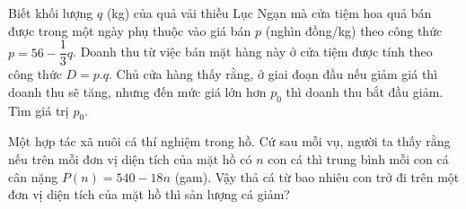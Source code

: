 \begin{bt}%
	Biết khối lượng $q$ (kg) của quả vải thiều Lục Ngạn mà cửa tiệm hoa quả bán được trong một ngày phụ thuộc vào giá bán $p$ (nghìn đồng/kg) theo công thức $p=56-\dfrac{1}{3}q$. Doanh thu từ việc bán mặt hàng này ở cửa tiệm được tính theo công thức $D=p.q$. Chủ cửa hàng thấy rằng, ở giai đoạn đầu nếu giảm giá thì doanh thu sẽ tăng, nhưng đến mức giá lớn hơn $p_0$ thì doanh thu bắt đầu giảm. Tìm giá trị $p_0$.
\end{bt}

\begin{bt}%
	Một hợp tác xã nuôi cá thí nghiệm trong hồ. Cứ sau mỗi vụ, người ta thấy rằng nếu trên mỗi đơn vị diện tích của mặt hồ có $n$ con cá thì trung bình mỗi con cá cân nặng $P\left( n \right)=540-18n$ (gam). Vậy thả cá từ bao nhiêu con trở đi trên một đơn vị diện tích của mặt hồ thì sản lượng cá giảm?
\end{bt}

